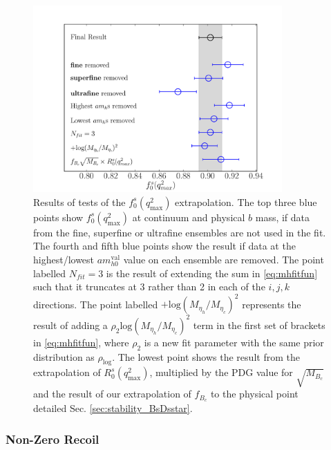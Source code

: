 \begin{figure}[ht]
  \begin{center}
  \hspace{-20pt}
  \includegraphics[width=0.85\textwidth]{images/BsDs/direct/f0q2max_stability.pdf}
  \caption{ Results of tests of the $f_0^s(q^2_{\text{max}})$ extrapolation. The top three blue points show $f_0^s(q^2_{\text{max}})$ at continuum and physical $b$ mass, if data from the fine, superfine or ultrafine ensembles are not used in the fit. The fourth and fifth blue points show the result if data at the highest/lowest $am_{h0}^{\text{val}}$ value on each ensemble are removed. The point labelled $N_{fit}=3$ is the result of extending the sum in \eqref{eq:mhfitfun} such that it truncates at 3 rather than 2 in each of the $i,j,k$ directions. The point labelled $+\text{log}(M_{\eta_h}/M_{\eta_c})^2$ represents the result of adding a $\rho_{2} \text{log}(M_{\eta_h}/M_{\eta_c})^2$ term in the first set of brackets in \eqref{eq:mhfitfun}, where $\rho_{2}$ is a new fit parameter with the same prior distribution as $\rho_{\text{log}}$. The lowest point shows the result from the extrapolation of $R_0^s(q^2_{\text{max}})$, multiplied by the PDG value for $\sqrt{M_{B_c}}$ \cite{PhysRevD.98.030001} and the result of our extrapolation of $f_{B_c}$ to the physical point detailed Sec. \ref{sec:stability_BsDsstar}.
    \label{fig:directtests}}
  \end{center}
\end{figure}

\subsubsection{Non-Zero Recoil}

